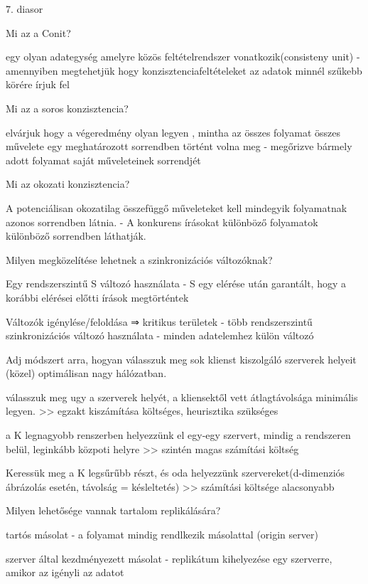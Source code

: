 \documentclass[12pt]{article}
\begin{document}
\begin{description}
        7. diasor
    \item  Mi az a Conit?
    \item egy olyan adategység amelyre közös feltételrendszer vonatkozik(consisteny unit)
        - amennyiben megtehetjük hogy konzisztenciafeltételeket az adatok minnél szűkebb körére írjuk fel
    \item  Mi az a soros konzisztencia?
    \item elvárjuk hogy a végeredmény olyan legyen , mintha az összes folyamat összes művelete
        egy meghatározott sorrendben történt volna meg
        - megőrizve bármely adott folyamat saját műveleteinek sorrendjét
    \item  Mi az okozati konzisztencia?
    \item A potenciálisan okozatilag összefüggő műveleteket kell mindegyik folyamatnak azonos sorrendben látnia.
        - A konkurens írásokat különböző folyamatok különböző sorrendben láthatják.
    \item  Milyen megközelítése lehetnek a szinkronizációs változóknak?
    \item Egy rendszerszintű S változó használata
        - S egy elérése után garantált, hogy a korábbi elérései előtti írások megtörténtek
    \item Változók  igénylése/feloldása ⇒ kritikus területek
        - több rendszerszintű szinkronizációs változó használata
        - minden adatelemhez külön változó
    \item  Adj módszert arra, hogyan válasszuk meg sok klienst kiszolgáló szerverek helyeit (közel) optimálisan nagy hálózatban.
    \item válasszuk meg ugy a szerverek helyét, a kliensektől vett átlagtávolsága minimális legyen.
        >> egzakt kiszámítása költséges, heurisztika szükséges
    \item a K legnagyobb renszerben helyezzünk el egy-egy szervert, mindig a rendszeren belül, leginkább közpoti helyre
        >>  szintén magas számítási költség
    \item Keressük meg a K legsűrűbb részt, és oda helyezzünk szervereket(d-dimenziós ábrázolás esetén, távolság = késleltetés)
        >> számítási költsége alacsonyabb	
    \item  Milyen lehetősége vannak tartalom replikálására?
    \item tartós másolat
        - a folyamat mindig rendlkezik másolattal (origin server)
    \item szerver által kezdményezett másolat
        - replikátum kihelyezése egy szerverre, amikor az igényli az adatot

\end{description}
\end{document}
